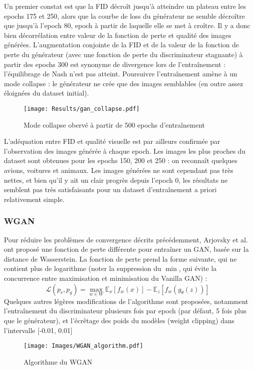 \documentclass{article}
\begin{document}
Un premier constat est que la FID décroît jusqu'à atteindre un plateau entre les epochs 175 et 250, alors que la courbe de loss du générateur ne semble décroître que jusqu'à l'epoch 80, epoch à partir de laquelle elle se met à croître. Il y a donc bien décorrélation entre valeur de la fonction de perte et qualité des images générées. L'augmentation conjointe de la FID et de la valeur de la fonction de perte du générateur (avec une fonction de perte du discriminateur stagnante) à partir des epochs 300 est synonyme de divergence lors de l'entraînement : l'équilibrage de Nash n'est pas atteint. Poursuivre l'entraînement amène à un mode collapse : le générateur ne crée que des images semblables (en outre assez éloignées du dataset initial). \par
\begin{figure}[htp]
    \centering
    \texttt{[image: Results/gan\_collapse.pdf]}
    \caption{Mode collapse obervé à partir de 500 epochs d'entraînement}
\end{figure}
L'adéquation entre FID et qualité visuelle est par ailleurs confirmée par l'observation des images générée à chaque epoch. Les images les plus proches du dataset sont obtenues pour les epochs 150, 200 et 250 : on reconnaît quelques avions, voitures et animaux. Les images générées ne sont cependant pas très nettes, et bien qu'il y ait un clair progrès depuis l'epoch 0, les résultats ne semblent pas très satisfaisants pour un dataset d'entraînement a priori relativement simple.

\subsubsection{WGAN}

Pour réduire les problèmes de convergence décrits précédemment, Arjovsky et al. \cite{wgan} ont proposé une fonction de perte différente pour entraîner un GAN, basée sur la distance de Wasserstein.
La fonction de perte prend la forme suivante, qui ne contient plus de logarithme (noter la suppression du $\min$, qui évite la concurrence entre maximisation et minimisation du Vanilla GAN) :
$$ \mathcal{L}(p_r, p_g) = \max_{w \in W} \mathbb{E}_x[f_w(x)] - \mathbb{E}_z[f_w(g_{\theta}(z))]$$
Quelques autres légères modifications de l'algorithme sont proposées, notamment l'entraînement du discriminateur plusieurs fois par epoch (par défaut, 5 fois plus que le générateur), et l'écrêtage des poids du modèles (weight clipping) dans l'intervalle [-0.01, 0.01]
\begin{figure}[H]
    \centering
    \texttt{[image: Images/WGAN\_algorithm.pdf]}
    \caption{Algorithme du WGAN}
\end{figure}
\end{document}

